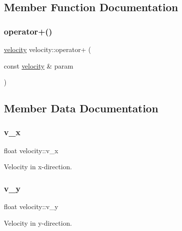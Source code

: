 \subsection{Member Function Documentation}
\mbox{\label{classvelocity_aff89ca788254a2c4a36bf065ef93dd2c}} 
\subsubsection{\texorpdfstring{operator+()}{operator+()}}
{\footnotesize\ttfamily \mbox{\hyperlink{classvelocity}{velocity}} velocity\+::operator+ (\begin{DoxyParamCaption}\item[{const \mbox{\hyperlink{classvelocity}{velocity}} \&}]{param }\end{DoxyParamCaption})}



\subsection{Member Data Documentation}
\mbox{\label{classvelocity_a3988e3839681be6b71357c5ea4de68e4}} 
\subsubsection{\texorpdfstring{v\+\_\+x}{v\_x}}
{\footnotesize\ttfamily float velocity\+::v\+\_\+x}



Velocity in x-\/direction. 

\mbox{\label{classvelocity_a1e894a568353bfa94db41117d332ff14}} 
\subsubsection{\texorpdfstring{v\+\_\+y}{v\_y}}
{\footnotesize\ttfamily float velocity\+::v\+\_\+y}



Velocity in y-\/direction. 

\mbox{\label{classvelocity_ae6409b77404f8487bbddb5e676120210}} 
